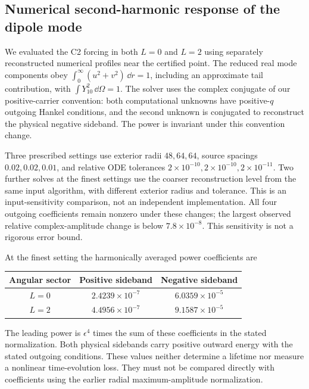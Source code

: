 \subsection{Numerical second-harmonic response of the dipole mode}
\label{nl:dipole-response}
We evaluated the C2 forcing in both $L=0$ and $L=2$ using separately
reconstructed numerical profiles near the certified point. The reduced
real mode components obey $\int_0^\infty(u^2+v^2)\,\dd r=1$, including
an approximate tail contribution, with $\int Y_{10}^2\,\dd\Omega=1$.
The solver uses the complex conjugate of our positive-carrier convention:
both computational unknowns have positive-$q$ outgoing Hankel conditions,
and the second unknown is conjugated to reconstruct the physical negative
sideband. The power is invariant under this convention change.

Three prescribed settings use exterior radii $48,64,64$, source spacings
$0.02,0.02,0.01$, and relative ODE tolerances
$2\times10^{-10},2\times10^{-10},2\times10^{-11}$. Two further solves at
the finest settings use the coarser reconstruction level from the same
input algorithm, with different exterior radius and tolerance. This is
an input-sensitivity comparison, not an independent implementation.
All four outgoing coefficients remain nonzero under these changes;
the largest observed relative complex-amplitude change is below
$7.8\times10^{-8}$. This sensitivity is not a rigorous error bound.

At the finest setting the harmonically averaged power coefficients are
\begin{center}
\begin{tabular}{ccc}
\toprule Angular sector&Positive sideband&Negative sideband\\\midrule
$L=0$&$2.4239\times10^{-7}$&$6.0359\times10^{-5}$\\
$L=2$&$4.4956\times10^{-7}$&$9.1587\times10^{-5}$\\\bottomrule
\end{tabular}
\end{center}
The leading power is $\epsilon^4$ times the sum of these coefficients in
the stated normalization. Both physical sidebands carry positive outward
energy with the stated outgoing conditions. These values neither determine a lifetime nor measure a
nonlinear time-evolution loss. They must not be compared directly with
coefficients using the earlier radial maximum-amplitude normalization.

